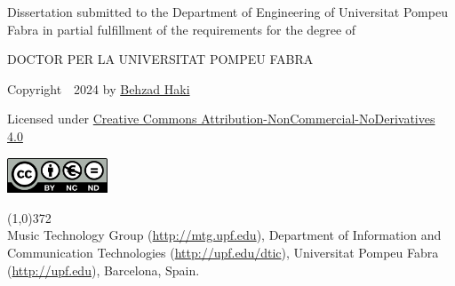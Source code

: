 \cleartorecto
\thispagestyle{empty}

\vspace*{02cm}

Dissertation submitted to the Department of Engineering of Universitat Pompeu Fabra in partial fulfillment of the requirements for the degree of

\vspace*{0.5cm}

\centerline{DOCTOR PER LA UNIVERSITAT POMPEU FABRA}


\vspace*{4cm}


{\centering

	Copyright~\textcopyright~2024 by \href{https://behzadhaki.com}{Behzad Haki}

	Licensed under \href{http://creativecommons.org/licenses/by-nc-nd/4.0/}{Creative Commons Attribution-NonCommercial-NoDerivatives 4.0}

	\vspace{0.5cm}

	\href{http://creativecommons.org/licenses/by-nc-nd/4.0/}
	{
		\centering
		\includegraphics[width=3cm]{src/annex/creative-commons.png}
		}

}

\vspace*{\fill}

\line(1,0){372}\\
\footnotesize
Music Technology Group (\url{http://mtg.upf.edu}), Department of Information and Communication Technologies (\url{http://upf.edu/dtic}), Universitat Pompeu Fabra (\url{http://upf.edu}), Barcelona, Spain.
\normalsize


